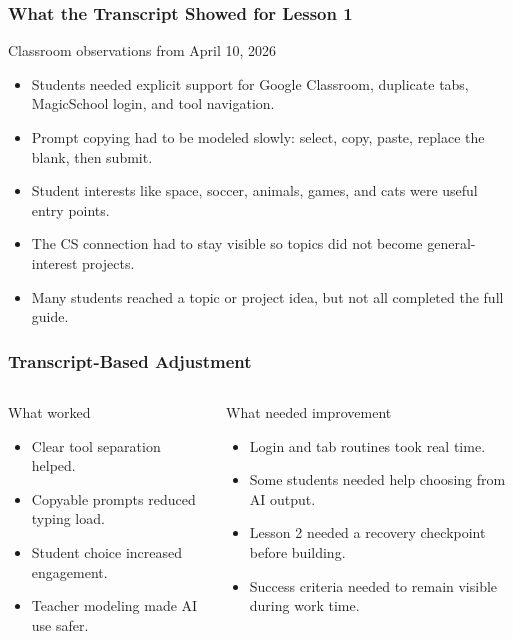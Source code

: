 \documentclass[aspectratio=169]{beamer}
\begin{document}
\begin{frame}
\frametitle{What the Transcript Showed for Lesson 1}
\begin{block}{Classroom observations from April 10, 2026}
\begin{itemize}
\large
\item Students needed explicit support for Google Classroom, duplicate tabs, MagicSchool login, and tool navigation.
\item Prompt copying had to be modeled slowly: select, copy, paste, replace the blank, then submit.
\item Student interests like space, soccer, animals, games, and cats were useful entry points.
\item The CS connection had to stay visible so topics did not become general-interest projects.
\item Many students reached a topic or project idea, but not all completed the full guide.
\end{itemize}
\end{block}
\end{frame}

\begin{frame}
\frametitle{Transcript-Based Adjustment}
\begin{columns}[T,totalwidth=\textwidth]
\begin{block}{What worked}
\begin{itemize}
\large
\item Clear tool separation helped.
\item Copyable prompts reduced typing load.
\item Student choice increased engagement.
\item Teacher modeling made AI use safer.
\end{itemize}
\end{block}
\begin{block}{What needed improvement}
\begin{itemize}
\large
\item Login and tab routines took real time.
\item Some students needed help choosing from AI output.
\item Lesson 2 needed a recovery checkpoint before building.
\item Success criteria needed to remain visible during work time.
\end{itemize}
\end{block}
\end{columns}
\end{frame}
\end{document}
